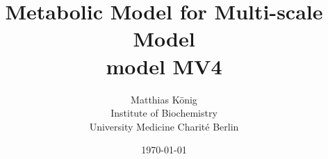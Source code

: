 \documentclass[pdftex, 10pt,a4paper]{article}
\begin{document}
\title{Metabolic Model for Multi-scale Model\\
 model MV4}
\author{Matthias König\\
Institute of Biochemistry\\
University Medicine Charité Berlin
}
\date{\today}
\maketitle
\small
\tableofcontents
\normalsize



\appendix
\tiny
% 
\end{document}
